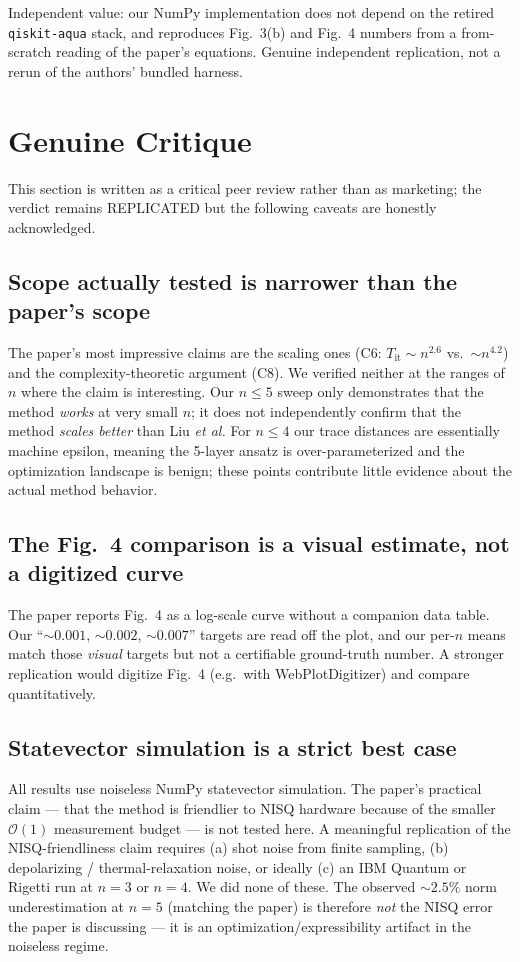 \documentclass[11pt]{article}
\begin{document}
Independent value: our NumPy implementation does not depend on the retired
\texttt{qiskit-aqua} stack, and reproduces Fig.~3(b) and Fig.~4 numbers from a
from-scratch reading of the paper's equations. Genuine independent replication, not
a rerun of the authors' bundled harness.

\section{Genuine Critique}
This section is written as a critical peer review rather than as marketing; the
verdict remains REPLICATED but the following caveats are honestly acknowledged.

\subsection{Scope actually tested is narrower than the paper's scope}
The paper's most impressive claims are the scaling ones (C6: $T_{\text{it}}\sim
n^{2.6}$ vs.\ $\sim n^{4.2}$) and the complexity-theoretic argument (C8). We
verified neither at the ranges of $n$ where the claim is interesting. Our $n \le 5$
sweep only demonstrates that the method \emph{works} at very small $n$; it does not
independently confirm that the method \emph{scales better} than Liu \emph{et al.}
For $n \le 4$ our trace distances are essentially machine epsilon, meaning the
5-layer ansatz is over-parameterized and the optimization landscape is benign;
these points contribute little evidence about the actual method behavior.

\subsection{The Fig.~4 comparison is a visual estimate, not a digitized curve}
The paper reports Fig.~4 as a log-scale curve without a companion data table.
Our ``$\sim 0.001$, $\sim 0.002$, $\sim 0.007$'' targets are read off the plot,
and our per-$n$ means match those \emph{visual} targets but not a certifiable
ground-truth number. A stronger replication would digitize Fig.~4 (e.g.\ with
WebPlotDigitizer) and compare quantitatively.

\subsection{Statevector simulation is a strict best case}
All results use noiseless NumPy statevector simulation. The paper's practical
claim --- that the method is friendlier to NISQ hardware because of the smaller
$\mathcal{O}(1)$ measurement budget --- is not tested here. A meaningful replication
of the NISQ-friendliness claim requires (a) shot noise from finite sampling,
(b) depolarizing / thermal-relaxation noise, or ideally (c) an IBM Quantum or
Rigetti run at $n=3$ or $n=4$. We did none of these. The observed $\sim\!2.5\%$
norm underestimation at $n=5$ (matching the paper) is therefore \emph{not} the
NISQ error the paper is discussing --- it is an optimization/expressibility artifact
in the noiseless regime.
\end{document}
